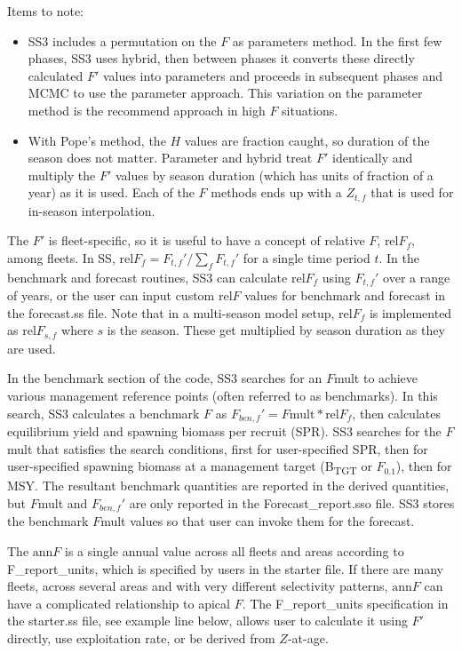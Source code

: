 Items to note:
\begin{itemize}
	\item SS3 includes a permutation on the $F$ as parameters method. In the first few phases, SS3 uses hybrid, then between phases it converts these directly calculated $F'$ values into parameters and proceeds in subsequent phases and MCMC to use the parameter approach. This variation on the parameter method is the recommend approach in high $F$ situations.
	
	\item With Pope’s method, the $H$ values are fraction caught, so duration of the season does not matter. Parameter and hybrid treat $F'$ identically and multiply the $F'$ values by season duration (which has units of fraction of a year) as it is used. Each of the $F$ methods ends up with a $Z_{t,f}$ that is used for in-season interpolation.
\end{itemize}

The $F'$ is fleet-specific, so it is useful to have a concept of relative $F$, $\text{rel}F_f$, among fleets. In SS, $\text{rel}F_f= F_{t,f}'/\sum_{f}^{}F_{t,f}'$ for a single time period $t$. In the benchmark and forecast routines, SS3 can calculate $\text{rel}F_f$ using $F_{t,f}'$ over a range of years, or the user can input custom $\text{rel}F$ values for benchmark and forecast in the forecast.ss file. Note that in a multi-season model setup, $\text{rel}F_f$ is implemented as $\text{rel}F_{s,f}$ where $s$ is the season. These get multiplied by season duration as they are used.

In the benchmark section of the code, SS3 searches for an $F$mult to achieve various management reference points (often referred to as benchmarks). In this search, SS3 calculates a benchmark $F$ as  $F_{ben,f}' = F\text{mult} * \text{rel}F_f$, then calculates equilibrium yield and spawning biomass per recruit (SPR). SS3 searches for the $F$mult that satisfies the search conditions, first for user-specified SPR, then for user-specified spawning biomass at a management target (B\textsubscript{TGT} or $F_{0.1}$), then for MSY. The resultant benchmark quantities are reported in the derived quantities, but $F$mult and $F_{ben,f}'$ are only reported in the Forecast\_report.sso file. SS3 stores the benchmark $F$mult values so that user can invoke them for the forecast.

The $\text{ann}F$ is a single annual value across all fleets and areas according to F\_report\_units, which is specified by users in the starter file. If there are many fleets, across several areas and with very different selectivity patterns, $\text{ann}F$ can have a complicated relationship to apical $F$. The F\_report\_units specification in the starter.ss file, see example line below, allows user to calculate it using $F'$ directly, use exploitation rate, or be derived from $Z$-at-age.

